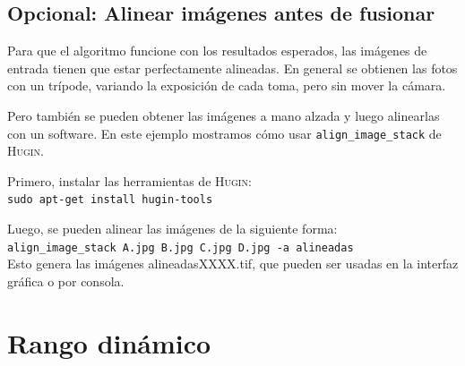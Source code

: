 \documentclass[a4paper,10pt]{article}
\begin{document}
        \subsection{Opcional: Alinear imágenes antes de fusionar}
            Para que el algoritmo funcione con los resultados esperados, las imágenes de entrada tienen que estar perfectamente alineadas.
            En general se obtienen las fotos con un trípode, variando la exposición de cada toma, pero sin mover la cámara.
            
            Pero también se pueden obtener las imágenes a mano alzada y luego alinearlas con un software. En este ejemplo mostramos cómo usar \texttt{align\_image\_stack} de \textsc{Hugin}.
            
            Primero, instalar las herramientas de \textsc{Hugin}:\\
            \texttt{sudo apt-get install hugin-tools}
            
            Luego, se pueden alinear las imágenes de la siguiente forma:\\
            \texttt{align\_image\_stack A.jpg B.jpg C.jpg D.jpg -a alineadas}\\
            Esto genera las imágenes alineadasXXXX.tif, que pueden ser usadas en la interfaz gráfica o por consola.

    \appendix

    \section{Rango dinámico}
\end{document}
